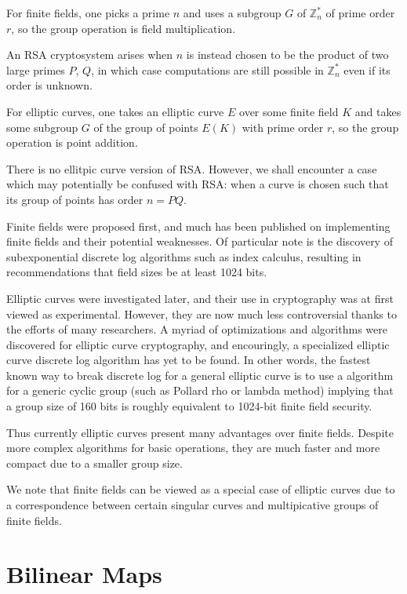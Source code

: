 For finite fields, one picks a prime $n$ and uses
a subgroup $G$ of $\mathbb{Z}_n^*$
of prime order $r$, so the group operation is field multiplication.

An RSA cryptosystem arises when $n$ is instead chosen to be the product of two
large primes $P$, $Q$, in which case computations are still possible
in $\mathbb{Z}_n^*$ even if its order is unknown.

For elliptic curves, one takes an elliptic curve $E$ over some
finite field $K$ and takes some subgroup $G$ of the group of points
$E(K)$ with prime order $r$, so the group operation is point addition.

There is no ellitpic curve version of RSA. However, we shall encounter
a case which may potentially be confused with RSA: when a curve is
chosen such that its group of points has order $n = PQ$.

Finite fields were proposed first, and much has been published
on implementing finite fields and their potential weaknesses.
Of particular note is the discovery of subexponential discrete log
algorithms such as index calculus, resulting in recommendations that
field sizes be at least 1024 bits.

Elliptic curves were investigated later, and their use in cryptography
was at first viewed as experimental. However, they are now much less
controversial thanks to the efforts of many researchers. A myriad
of optimizations
and algorithms were discovered for elliptic curve cryptography,
and encouringly, a specialized elliptic curve discrete log algorithm
has yet to be found. In other words, the fastest known way to break discrete log
for a general elliptic curve is to use a algorithm for a generic
cyclic group (such as Pollard rho or lambda method) implying that a group
size of 160 bits is roughly equivalent to 1024-bit finite field security.

Thus currently elliptic curves present many advantages over finite fields.
Despite more complex algorithms for basic operations, they are much faster
and more compact due to a smaller group size.

We note that finite fields can be viewed as a special case of elliptic
curves due to a correspondence between certain singular curves and
multipicative groups of finite fields.

\section{Bilinear Maps}

